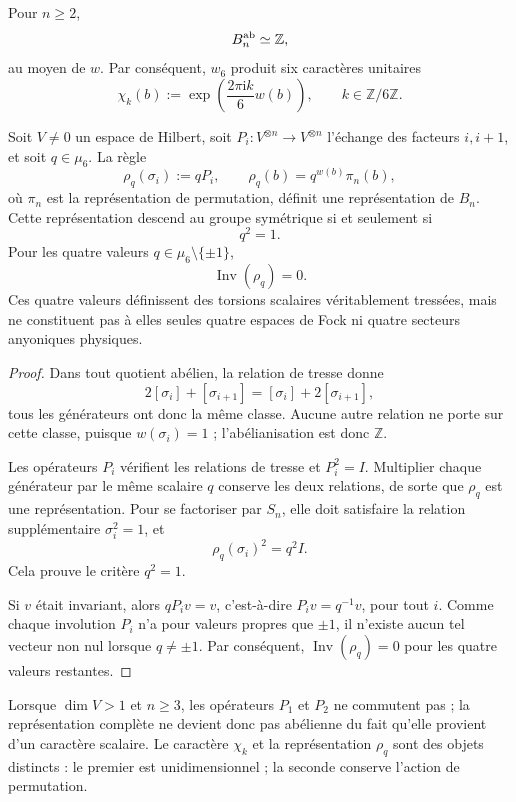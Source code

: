 \begin{theorem}
\label{thm:trenzas-caracteres-z6}
Pour \(n\geq2\),
\[
 B_n^{\rm ab}\simeq\mathbb Z,
\]
au moyen de \(w\). Par conséquent, \(w_6\) produit six caractères unitaires
\[
 \chi_k(b)
 :=\exp\!\left(\frac{2\pi\mathrm i k}{6}w(b)\right),
 \qquad k\in\mathbb Z/6\mathbb Z.
\]

Soit \(V\ne0\) un espace de Hilbert, soit \(P_i:V^{\otimes n}\to V^{\otimes n}\) l’échange des facteurs \(i,i+1\), et soit \(q\in\mu_6\). La règle
\[
 \rho_q(\sigma_i):=qP_i,
 \qquad
 \rho_q(b)=q^{w(b)}\pi_n(b),
\]
où \(\pi_n\) est la représentation de permutation, définit une représentation de \(B_n\). Cette représentation descend au groupe symétrique si et seulement si
\[
 q^2=1.
\]
Pour les quatre valeurs \(q\in\mu_6\setminus\{\pm1\}\),
\[
 \operatorname{Inv}(\rho_q)=0.
\]
Ces quatre valeurs définissent des torsions scalaires véritablement tressées, mais ne constituent pas à elles seules quatre espaces de Fock ni quatre secteurs anyoniques physiques.
\end{theorem}

\begin{proof}
Dans tout quotient abélien, la relation de tresse donne
\[
 2[\sigma_i]+[\sigma_{i+1}]
 =[\sigma_i]+2[\sigma_{i+1}],
\]
tous les générateurs ont donc la même classe. Aucune autre relation ne porte sur cette classe, puisque \(w(\sigma_i)=1\) ; l’abélianisation est donc \(\mathbb Z\).

Les opérateurs \(P_i\) vérifient les relations de tresse et \(P_i^2=I\). Multiplier chaque générateur par le même scalaire \(q\) conserve les deux relations, de sorte que \(\rho_q\) est une représentation. Pour se factoriser par \(S_n\), elle doit satisfaire la relation supplémentaire \(\sigma_i^2=1\), et
\[
 \rho_q(\sigma_i)^2=q^2I.
\]
Cela prouve le critère \(q^2=1\).

Si \(v\) était invariant, alors \(qP_i v=v\), c’est-à-dire \(P_i v=q^{-1}v\), pour tout \(i\). Comme chaque involution \(P_i\) n’a pour valeurs propres que \(\pm1\), il n’existe aucun tel vecteur non nul lorsque \(q\ne\pm1\). Par conséquent, \(\operatorname{Inv}(\rho_q)=0\) pour les quatre valeurs restantes.
\end{proof}

Lorsque \(\dim V>1\) et \(n\geq3\), les opérateurs \(P_1\) et \(P_2\) ne commutent pas ; la représentation complète ne devient donc pas abélienne du fait qu’elle provient d’un caractère scalaire. Le caractère \(\chi_k\) et la représentation \(\rho_q\) sont des objets distincts : le premier est unidimensionnel ; la seconde conserve l’action de permutation.

